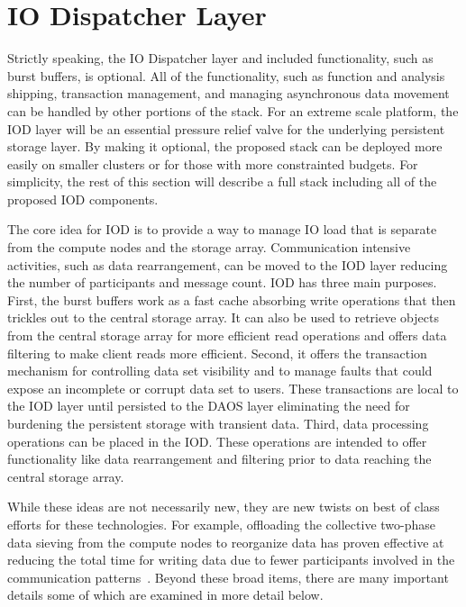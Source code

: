 \documentclass[conference]{IEEEtran}
\begin{document}
\section{IO Dispatcher Layer}
\label{sec:iod}

Strictly speaking, the IO Dispatcher layer and included functionality, such as
burst buffers, is optional. All of the functionality, such as function and
analysis shipping, transaction management, and managing asynchronous data
movement can be handled by other portions of the stack. For an extreme scale
platform, the IOD layer will be an essential pressure relief valve for the
underlying persistent storage layer. By making it optional, the proposed stack
can be deployed more easily on smaller clusters or for those with more
constrainted budgets. For simplicity, the rest of this section will describe a
full stack including all of the proposed IOD components.

The core idea for IOD is to provide a way to manage IO load that is
separate from the compute nodes and the storage array. Communication intensive
activities, such as data rearrangement, can be moved to the IOD layer
reducing the number of participants and message count. IOD has three main
purposes. First, the burst buffers work as a fast cache absorbing write
operations that then trickles out to the central storage array. It can also
be used to retrieve objects from the central storage array for more efficient
read operations and offers data filtering to make client reads more efficient.
Second, it offers the transaction mechanism for controlling data set visibility
and to manage faults that could expose an incomplete or corrupt data set to
users. These transactions are local to the IOD layer until persisted to the
DAOS layer eliminating the need for burdening the persistent storage with
transient data.  Third, data processing operations can be placed in the IOD.
These operations are intended to offer functionality like data rearrangement
and filtering prior to data reaching the central storage array.

While these ideas are not necessarily new, they are new twists on best of class
efforts for these technologies. For example, offloading the collective
two-phase data sieving from the compute nodes to reorganize data has proven
effective at reducing the total time for writing data due to fewer participants
involved in the communication patterns~\cite{lofstead:2011:nessie-staging}.
Beyond these broad items, there are many important details some of which are
examined in more detail below.
\end{document}
